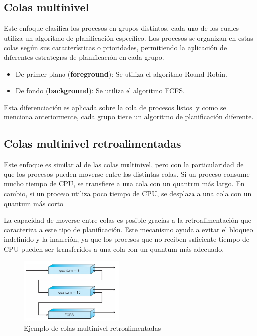 \documentclass{templateNote}
\begin{document}
\subsection*{Colas multinivel} 
Este enfoque clasifica los procesos en grupos distintos, cada uno de los cuales utiliza un algoritmo de planificación específico. Los procesos se organizan en estas colas según sus características o prioridades, permitiendo la aplicación de diferentes estrategias de planificación en cada grupo.
\begin{itemize}
    \item De primer plano (\textbf{foreground}): Se utiliza el algoritmo Round Robin.
    \item De fondo (\textbf{background}): Se utiliza el algoritmo FCFS.
\end{itemize}
Esta diferenciación es aplicada sobre la cola de procesos listos, y como se menciona anteriormente, cada grupo tiene un algoritmo de planificación diferente.


\subsection*{Colas multinivel retroalimentadas}
Este enfoque es similar al de las colas multinivel, pero con la particularidad de que los procesos pueden moverse entre las distintas colas. Si un proceso consume mucho tiempo de CPU, se transfiere a una cola con un quantum más largo. En cambio, si un proceso utiliza poco tiempo de CPU, se desplaza a una cola con un quantum más corto.

La capacidad de moverse entre colas es posible gracias a la retroalimentación que caracteriza a este tipo de planificación. Este mecanismo ayuda a evitar el bloqueo indefinido y la inanición, ya que los procesos que no reciben suficiente tiempo de CPU pueden ser transferidos a una cola con un quantum más adecuado.

\begin{figure}[H]
    \centering
    \includegraphics[width=0.45\textwidth]{img/multiniver.png}
    \caption{Ejemplo de colas multinivel retroalimentadas}
\end{figure}
\end{document}
